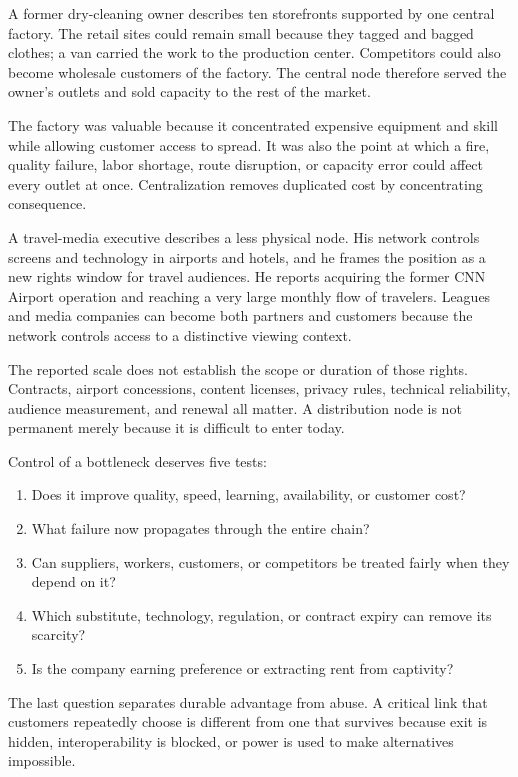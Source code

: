 A former dry-cleaning owner describes ten storefronts supported by one central
factory. The retail sites could remain small because they tagged and bagged
clothes; a van carried the work to the production center. Competitors could
also become wholesale customers of the factory. The central node therefore
served the owner's outlets and sold capacity to the rest of the market.

The factory was valuable because it concentrated expensive equipment and
skill while allowing customer access to spread. It was also the point at which
a fire, quality failure, labor shortage, route disruption, or capacity error
could affect every outlet at once. Centralization removes duplicated cost by
concentrating consequence.

A travel-media executive describes a less physical node. His network controls
screens and technology in airports and hotels, and he frames the position as a
new rights window for travel audiences. He reports acquiring the former CNN
Airport operation and reaching a very large monthly flow of travelers. Leagues
and media companies can become both partners and customers because the network
controls access to a distinctive viewing context.

The reported scale does not establish the scope or duration of those rights.
Contracts, airport concessions, content licenses, privacy rules, technical
reliability, audience measurement, and renewal all matter. A distribution node
is not permanent merely because it is difficult to enter today.

Control of a bottleneck deserves five tests:

\begin{enumerate}[itemsep=0.15em]
\item Does it improve quality, speed, learning, availability, or customer cost?
\item What failure now propagates through the entire chain?
\item Can suppliers, workers, customers, or competitors be treated fairly when
  they depend on it?
\item Which substitute, technology, regulation, or contract expiry can remove
  its scarcity?
\item Is the company earning preference or extracting rent from captivity?
\end{enumerate}

The last question separates durable advantage from abuse. A critical link that
customers repeatedly choose is different from one that survives because exit
is hidden, interoperability is blocked, or power is used to make alternatives
impossible.

